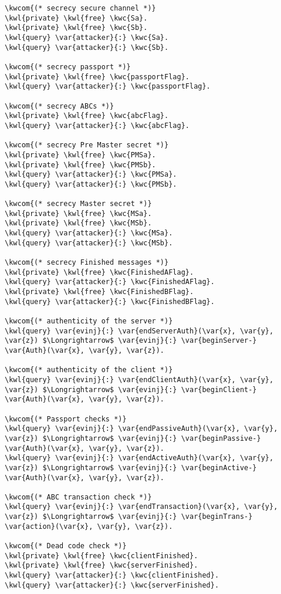 \begin{Verbatim}[commandchars=\\\{\},codes={\catcode`$=3}]
\kwcom{(* secrecy secure channel *)}
\kwl{private} \kwl{free} \kwc{Sa}.
\kwl{private} \kwl{free} \kwc{Sb}.
\kwl{query} \var{attacker}{:} \kwc{Sa}.
\kwl{query} \var{attacker}{:} \kwc{Sb}.

\kwcom{(* secrecy passport *)}
\kwl{private} \kwl{free} \kwc{passportFlag}.
\kwl{query} \var{attacker}{:} \kwc{passportFlag}.

\kwcom{(* secrecy ABCs *)}
\kwl{private} \kwl{free} \kwc{abcFlag}.
\kwl{query} \var{attacker}{:} \kwc{abcFlag}.

\kwcom{(* secrecy Pre Master secret *)}
\kwl{private} \kwl{free} \kwc{PMSa}.
\kwl{private} \kwl{free} \kwc{PMSb}.
\kwl{query} \var{attacker}{:} \kwc{PMSa}.
\kwl{query} \var{attacker}{:} \kwc{PMSb}.

\kwcom{(* secrecy Master secret *)}
\kwl{private} \kwl{free} \kwc{MSa}.
\kwl{private} \kwl{free} \kwc{MSb}.
\kwl{query} \var{attacker}{:} \kwc{MSa}.
\kwl{query} \var{attacker}{:} \kwc{MSb}.

\kwcom{(* secrecy Finished messages *)}
\kwl{private} \kwl{free} \kwc{FinishedAFlag}.
\kwl{query} \var{attacker}{:} \kwc{FinishedAFlag}.
\kwl{private} \kwl{free} \kwc{FinishedBFlag}.
\kwl{query} \var{attacker}{:} \kwc{FinishedBFlag}.

\kwcom{(* authenticity of the server *)}
\kwl{query} \var{evinj}{:} \var{endServerAuth}(\var{x}, \var{y}, \var{z}) $\Longrightarrow$ \var{evinj}{:} \var{beginServer-}
\var{Auth}(\var{x}, \var{y}, \var{z}).

\kwcom{(* authenticity of the client *)}
\kwl{query} \var{evinj}{:} \var{endClientAuth}(\var{x}, \var{y}, \var{z}) $\Longrightarrow$ \var{evinj}{:} \var{beginClient-}
\var{Auth}(\var{x}, \var{y}, \var{z}).

\kwcom{(* Passport checks *)}
\kwl{query} \var{evinj}{:} \var{endPassiveAuth}(\var{x}, \var{y}, \var{z}) $\Longrightarrow$ \var{evinj}{:} \var{beginPassive-}
\var{Auth}(\var{x}, \var{y}, \var{z}).
\kwl{query} \var{evinj}{:} \var{endActiveAuth}(\var{x}, \var{y}, \var{z}) $\Longrightarrow$ \var{evinj}{:} \var{beginActive-}
\var{Auth}(\var{x}, \var{y}, \var{z}).

\kwcom{(* ABC transaction check *)}
\kwl{query} \var{evinj}{:} \var{endTransaction}(\var{x}, \var{y}, \var{z}) $\Longrightarrow$ \var{evinj}{:} \var{beginTrans-}
\var{action}(\var{x}, \var{y}, \var{z}).

\kwcom{(* Dead code check *)}
\kwl{private} \kwl{free} \kwc{clientFinished}.
\kwl{private} \kwl{free} \kwc{serverFinished}.
\kwl{query} \var{attacker}{:} \kwc{clientFinished}.
\kwl{query} \var{attacker}{:} \kwc{serverFinished}.
\end{Verbatim}

